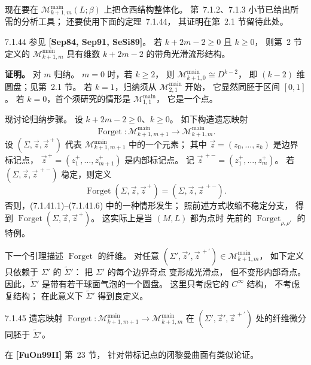 
现在要在
$\mathcal M^{\mathrm{main}}_{k+1,m}(L;\beta)$
上把仓西结构整体化。
第~7.1.2、7.1.3 小节已给出所需的分析工具；
还要使用下面的定理~7.1.44，
其证明在第~2.1 节留待此处。

\begin{theorem}{7.1.44}\label{thm:7-1-44}
参见 \textbf{[Sep84, Sep91, SeSi89]}。
若 $k+2m-2\ge0$ 且 $k\ge0$，
则第~2 节定义的
$\mathcal M^{\mathrm{main}}_{k+1,m}$
具有维数 $k+2m-2$ 的带角光滑流形结构。
\end{theorem}

\noindent\textbf{证明。}
对 $m$ 归纳。
$m=0$ 时，若 $k\ge2$，
则
$\mathcal M^{\mathrm{main}}_{k+1,0}
\cong D^{k-2}$，
即 $(k-2)$ 维圆盘；见第~2.1 节。
若 $k=1$，归纳须从
$\mathcal M^{\mathrm{main}}_{2,1}$ 开始，
它显然同胚于区间 $[0,1]$。
若 $k=0$，首个须研究的情形是
$\mathcal M^{\mathrm{main}}_{1,1}$，
它是一个点。

现讨论归纳步骤。
设 $k+2m-2\ge0$、$k\ge0$。
如下构造遗忘映射
\[
\operatorname{Forget}\colon
\mathcal M^{\mathrm{main}}_{k+1,m+1}
\longrightarrow
\mathcal M^{\mathrm{main}}_{k+1,m}.
\]
设
$(\Sigma,\vec z,\vec z^{\, +})$
代表
$\mathcal M^{\mathrm{main}}_{k+1,m+1}$
中的一个元素；
其中
$\vec z=(z_0,\ldots,z_k)$
是边界标记点，
$\vec z^{\, +}=(z_1^+,\ldots,z_{m+1}^+)$
是内部标记点。
记
$\vec z^{\, + -}=(z_1^+,\ldots,z_m^+)$。
若
$(\Sigma,\vec z,\vec z^{\, + -})$
稳定，则定义
\[
\operatorname{Forget}(\Sigma,\vec z,\vec z^{\, +})
=(\Sigma,\vec z,\vec z^{\, + -}).
\]
否则，(7.1.41.1)--(7.1.41.6)
中的一种情形发生；
照前述方式收缩不稳定分支，
得到
$\operatorname{Forget}(\Sigma,\vec z,\vec z^{\, +})$。
这实际上是当 $(M,L)$ 都为点时
先前的
$\operatorname{Forget}_{\rho,\rho'}$
的特例。

下一个引理描述
$\operatorname{Forget}$ 的纤维。
对任意
$(\Sigma',\vec z',\vec z^{\, +\prime})
\in\mathcal M^{\mathrm{main}}_{k+1,m}$，
如下定义只依赖于 $\Sigma'$ 的
$\widetilde\Sigma'$：
把 $\Sigma'$ 的每个边界奇点
变形成光滑点，
但不变形内部奇点。
因此，$\widetilde\Sigma'$
是带有若干球面气泡的一个圆盘。
这里只考虑它的 $C^\infty$ 结构，
不考虑复结构；
在此意义下
$\widetilde\Sigma'$ 得到良定义。

\begin{lemma}{7.1.45}\label{lem:7-1-45}
遗忘映射
$\operatorname{Forget}\colon
\mathcal M^{\mathrm{main}}_{k+1,m+1}
\to\mathcal M^{\mathrm{main}}_{k+1,m}$
在
$(\Sigma',\vec z',\vec z^{\, +\prime})$
处的纤维微分同胚于
$\widetilde\Sigma'$。
\end{lemma}

在 \textbf{[FuOn99II]} 第~23 节，
针对带标记点的闭黎曼曲面有类似论证。

